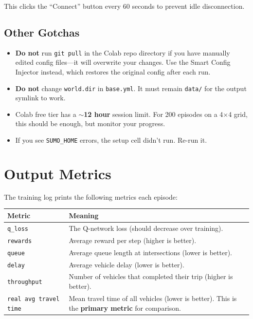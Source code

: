 \documentclass[11pt,a4paper]{article}
\begin{document}
This clicks the ``Connect'' button every 60 seconds to prevent idle disconnection.

\subsection{Other Gotchas}

\begin{itemize}
    \item \textbf{Do not} run \texttt{git pull} in the Colab repo directory if you have manually edited config files---it will overwrite your changes. Use the Smart Config Injector instead, which restores the original config after each run.
    \item \textbf{Do not} change \texttt{world.dir} in \texttt{base.yml}. It must remain \texttt{data/} for the output symlink to work.
    \item Colab free tier has a \textbf{$\sim$12 hour} session limit. For 200 episodes on a 4$\times$4 grid, this should be enough, but monitor your progress.
    \item If you see \texttt{SUMO\_HOME} errors, the setup cell didn't run. Re-run it.
\end{itemize}

\section{Output Metrics}

The training log prints the following metrics each episode:

\begin{center}
\begin{longtable}{lp{9cm}}
\toprule
\textbf{Metric} & \textbf{Meaning} \\
\midrule
\endhead
\texttt{q\_loss}        & The Q-network loss (should decrease over training). \\
\texttt{rewards}        & Average reward per step (higher is better). \\
\texttt{queue}          & Average queue length at intersections (lower is better). \\
\texttt{delay}          & Average vehicle delay (lower is better). \\
\texttt{throughput}     & Number of vehicles that completed their trip (higher is better). \\
\texttt{real avg travel time} & Mean travel time of all vehicles (lower is better). This is the \textbf{primary metric} for comparison. \\
\bottomrule
\end{longtable}
\end{center}
\end{document}
